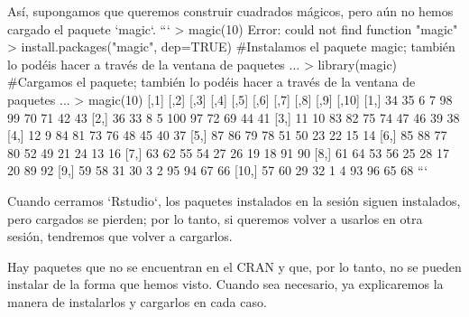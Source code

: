 Así, supongamos que queremos construir cuadrados mágicos, pero aún no hemos cargado el paquete `magic`.
```
> magic(10)
Error: could not find function "magic"
> install.packages("magic", dep=TRUE) #Instalamos el paquete magic; también lo podéis hacer a través de la ventana de paquetes
...
> library(magic)  #Cargamos el paquete; también lo podéis hacer a través de la ventana de paquetes
...
> magic(10)
      [,1] [,2] [,3] [,4] [,5] [,6] [,7] [,8] [,9] [,10]
 [1,]   34   35    6    7   98   99   70   71   42    43
 [2,]   36   33    8    5  100   97   72   69   44    41
 [3,]   11   10   83   82   75   74   47   46   39    38
 [4,]   12    9   84   81   73   76   48   45   40    37
 [5,]   87   86   79   78   51   50   23   22   15    14
 [6,]   85   88   77   80   52   49   21   24   13    16
 [7,]   63   62   55   54   27   26   19   18   91    90
 [8,]   61   64   53   56   25   28   17   20   89    92
 [9,]   59   58   31   30    3    2   95   94   67    66
[10,]   57   60   29   32    1    4   93   96   65    68
```

Cuando cerramos `Rstudio`, los paquetes instalados en la sesión siguen instalados, pero cargados se pierden; por lo tanto, si queremos volver a usarlos en otra sesión, tendremos que volver a cargarlos.

Hay paquetes que no se encuentran en el CRAN y que, por lo tanto, no se pueden instalar de la forma que hemos visto. Cuando sea necesario, ya explicaremos la manera de instalarlos y cargarlos en cada caso. 





